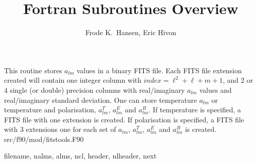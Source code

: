 
\sloppy


\title{\healpix Fortran Subroutines Overview}
 \section[alms2fits*]{ }
\label{sub:alms2fits}
\author{Frode K.~Hansen, Eric Hivon}

\begin{facility}
{This routine stores  $a_{lm}$  values in a binary FITS file. Each FITS file
  extension created will contain one integer column with
  $index=\ell^2+\ell+m+1$, and 2 or 4 single (or double) precision columns with real/imaginary  $a_{lm}$  values and real/imaginary   standard deviation. One can store temperature $a_{lm}$ or temperature and polarisation, $a^T_{lm}$, $a^E_{lm}$ and $a^B_{lm}$. If temperature is specified, a FITS file with one extension is created. If polarisation is specified, a FITS file with 3 extensions one for each set of $a_{lm}$, $a_{lm}^T$, $a_{lm}^E$ and $a_{lm}^B$ is created.}
{src/f90/mod/fitstools.F90}
\end{facility}

\begin{f90format}
{filename, nalms, alms, ncl, header, nlheader, next}
\end{f90format}

